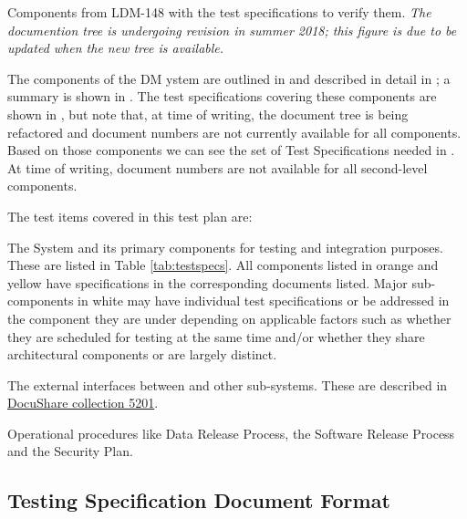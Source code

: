 \begin{table}
	\caption{Components from LDM-148 with the test specifications to verify them.
    \emph{The documention tree is undergoing revision in summer 2018; this figure is due to be updated when the new tree is available.}
    \label{tab:testspecs}}
	
\end{table}

The components of the DM ystem are outlined in  and described in detail in ; a summary is shown in .
The test specifications covering these components are shown in , but note that, at time of writing, the document tree is being refactored and document numbers are not currently available for all components.
Based on those components we can see the set of Test Specifications needed in .
At time of writing, document numbers are not available for all second-level components.

The test items covered in this test plan are:

\begin{itemize_single}

\item The \product{} System and its primary components for testing and integration purposes. These are listed in Table \ref{tab:testspecs}. All components listed in orange and yellow have specifications in the corresponding documents listed. Major sub-components in white may have individual test specifications or be addressed in the component they are under depending on applicable factors such as whether they are scheduled for testing at the same time and/or whether they share architectural components or are largely distinct.

\item The external interfaces between \product{} and other sub-systems. These are described in \href{https://ls.st/Collection-5201}{DocuShare collection 5201}.

\item Operational procedures like Data Release Process, the Software Release Process and the Security Plan.

\end{itemize_single}

\subsection{Testing Specification Document Format}\label{sect:tsform}

